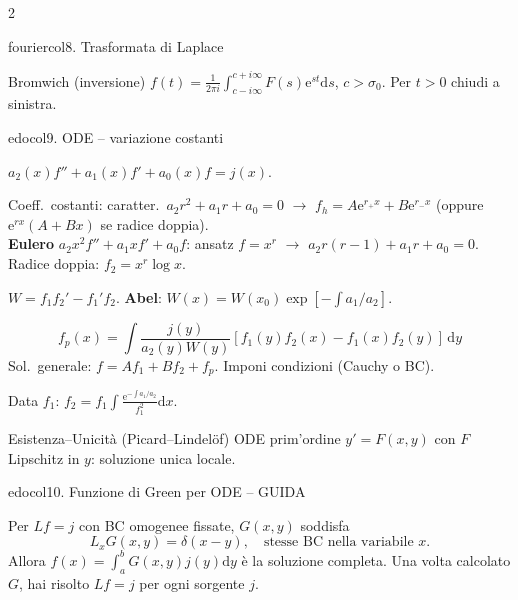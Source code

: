 \documentclass[10pt,a4paper]{article}
\newcommand{\dd}{\mathrm{d}}
\newcommand{\eu}{\mathrm{e}}
\begin{document}
\begin{multicols}{2}
\begin{secbox}{fouriercol}{8. Trasformata di Laplace}
\begin{teobox}{Bromwich (inversione)}
$f(t)=\frac{1}{2\pi i}\int_{c-i\infty}^{c+i\infty}F(s)\eu^{st}\dd s$, $c>\sigma_0$. Per $t>0$ chiudi a sinistra.
\end{teobox}

\end{secbox}

\begin{secbox}{edocol}{9. ODE -- variazione costanti}

$a_2(x)f''+a_1(x)f'+a_0(x)f=j(x)$.

Coeff.\ costanti: caratter.\ $a_2r^2+a_1r+a_0=0$ $\to$ $f_h=A\eu^{r_+x}+B\eu^{r_-x}$ (oppure $\eu^{rx}(A+Bx)$ se radice doppia).\\
\textbf{Eulero} $a_2x^2f''+a_1xf'+a_0f$: ansatz $f=x^r$ $\to$ $a_2r(r-1)+a_1r+a_0=0$. Radice doppia: $f_2=x^r\log x$.

$W=f_1f_2'-f_1'f_2$. \;\textbf{Abel}: $W(x)=W(x_0)\exp[-\!\int a_1/a_2]$.

$$f_p(x)=\!\int\!\frac{j(y)}{a_2(y)W(y)}[f_1(y)f_2(x)-f_1(x)f_2(y)]\,\dd y$$
Sol.\ generale: $f=Af_1+Bf_2+f_p$. Imponi condizioni (Cauchy o BC).

Data $f_1$: $f_2=f_1\int\frac{\eu^{-\!\int a_1/a_2}}{f_1^2}\dd x$.

\begin{teobox}{Esistenza--Unicità (Picard--Lindel\"of)}
ODE prim'ordine $y'=F(x,y)$ con $F$ Lipschitz in $y$: soluzione unica locale.
\end{teobox}

\end{secbox}

\begin{secbox}{edocol}{10. Funzione di Green per ODE -- GUIDA}

Per $Lf=j$ con BC omogenee fissate, $G(x,y)$ soddisfa
$$L_x G(x,y)=\delta(x-y),\quad\text{stesse BC nella variabile $x$}.$$
Allora $f(x)=\int_a^bG(x,y)j(y)\dd y$ è la soluzione completa. Una volta calcolato $G$, hai risolto $Lf=j$ per ogni sorgente $j$.


\end{secbox}
\end{multicols}
\end{document}
